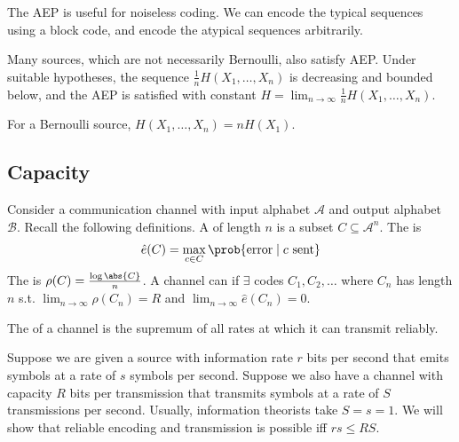 \begin{remark}
    The AEP is useful for noiseless coding.
    We can encode the typical sequences using a block code, and encode the atypical sequences arbitrarily.

    Many sources, which are not necessarily Bernoulli, also satisfy AEP.
    Under suitable hypotheses, the sequence $\frac{1}{n} H(X_1, \dots, X_n)$ is decreasing and bounded below, and the AEP is satisfied with constant $H = \lim_{n \to \infty} \frac{1}{n} H(X_1, \dots, X_n)$.

    For a Bernoulli source, $H(X_1, \dots, X_n) = n H(X_1)$.
\end{remark}

\subsection{Capacity}
Consider a communication channel with input alphabet $\mathcal A$ and output alphabet $\mathcal B$.
Recall the following definitions.
A  of length $n$ is a subset $C \subseteq \mathcal A^n$.
The  is
\begin{align*}
        \hat e(C) = \max_{c \in C} \prob{\text{error} \mid c \text{ sent}}
    \end{align*}
The  is $\rho(C) = \frac{\log \abs{C}}{n}$.
A channel can  if $\exists$ codes $C_1, C_2, \dots$ where $C_n$ has length $n$ s.t. $\lim_{n \to \infty} \rho(C_n) = R$ and $\lim_{n \to \infty} \hat e(C_n) = 0$.

\begin{definition}
    The  of a channel is the supremum of all rates at which it can transmit reliably.
\end{definition}

Suppose we are given a source with information rate $r$ bits per second that emits symbols at a rate of $s$ symbols per second.
Suppose we also have a channel with capacity $R$ bits per transmission that transmits symbols at a rate of $S$ transmissions per second.
Usually, information theorists take $S = s = 1$.
We will show that reliable encoding and transmission is possible iff $rs \leq RS$.

